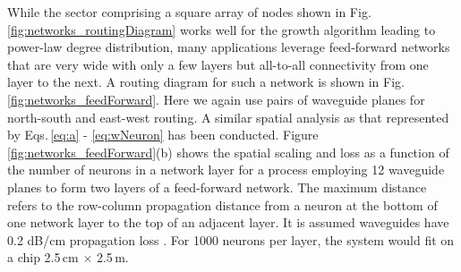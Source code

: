 \documentclass[twocolumn]{article}
\begin{document}
While the sector comprising a square array of nodes shown in Fig.\,\ref{fig:networks_routingDiagram} works well for the growth algorithm leading to power-law degree distribution, many applications leverage feed-forward networks that are very wide with only a few layers but all-to-all connectivity from one layer to the next. A routing diagram for such a network is shown in Fig.\,\ref{fig:networks_feedForward}. Here we again use pairs of waveguide planes for north-south and east-west routing. A similar spatial analysis as that represented by Eqs.\,\ref{eq:a} - \ref{eq:wNeuron} has been conducted. Figure \ref{fig:networks_feedForward}(b) shows the spatial scaling and loss as a function of the number of neurons in a network layer for a process employing 12 waveguide planes to form two layers of a feed-forward network. The maximum distance refers to the row-column propagation distance from a neuron at the bottom of one network layer to the top of an adjacent layer. It is assumed waveguides have 0.2 dB/cm propagation loss \cite{ch2018}. For 1000 neurons per layer, the system would fit on a chip 2.5\,cm $\times$ 2.5\,m.
\end{document}
